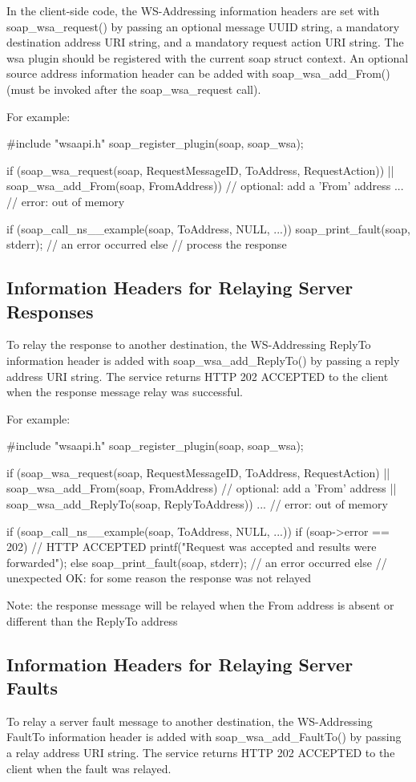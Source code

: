 In the client-\/side code, the WS-\/Addressing information headers are set with soap\_\-wsa\_\-request() by passing an optional message UUID string, a mandatory destination address URI string, and a mandatory request action URI string. The wsa plugin should be registered with the current soap struct context. An optional source address information header can be added with soap\_\-wsa\_\-add\_\-From() (must be invoked after the soap\_\-wsa\_\-request call).

For example:


\begin{DoxyCode}
#include "wsaapi.h"
soap_register_plugin(soap, soap_wsa);

if (soap_wsa_request(soap, RequestMessageID, ToAddress, RequestAction))
 || soap_wsa_add_From(soap, FromAddress)) // optional: add a 'From' address
  ... // error: out of memory

if (soap_call_ns__example(soap, ToAddress, NULL, ...))
  soap_print_fault(soap, stderr); // an error occurred
else
  // process the response 
\end{DoxyCode}
\hypertarget{wsa__0_wsa_2_2}{}\subsection{Information Headers for Relaying Server Responses}\label{wsa__0_wsa_2_2}
To relay the response to another destination, the WS-\/Addressing ReplyTo information header is added with soap\_\-wsa\_\-add\_\-ReplyTo() by passing a reply address URI string. The service returns HTTP 202 ACCEPTED to the client when the response message relay was successful.

For example:


\begin{DoxyCode}
#include "wsaapi.h"
soap_register_plugin(soap, soap_wsa);

if (soap_wsa_request(soap, RequestMessageID, ToAddress, RequestAction)
 || soap_wsa_add_From(soap, FromAddress) // optional: add a 'From' address
 || soap_wsa_add_ReplyTo(soap, ReplyToAddress))
  ... // error: out of memory

if (soap_call_ns__example(soap, ToAddress, NULL, ...))
{
  if (soap->error == 202) // HTTP ACCEPTED
    printf("Request was accepted and results were forwarded\n");
  else
    soap_print_fault(soap, stderr); // an error occurred
}
else
  // unexpected OK: for some reason the response was not relayed
\end{DoxyCode}


Note: the response message will be relayed when the From address is absent or different than the ReplyTo address\hypertarget{wsa__0_wsa_2_3}{}\subsection{Information Headers for Relaying Server Faults}\label{wsa__0_wsa_2_3}
To relay a server fault message to another destination, the WS-\/Addressing FaultTo information header is added with soap\_\-wsa\_\-add\_\-FaultTo() by passing a relay address URI string. The service returns HTTP 202 ACCEPTED to the client when the fault was relayed.

